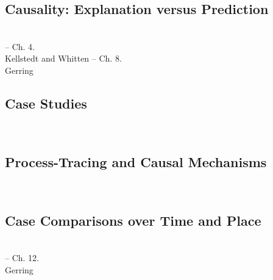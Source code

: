 \documentclass[12pt,a4paper]{article}
\newcommand{\lecture}[3][\DefaultOpt]{%
  \def\DefaultOpt{#2}%
  \clearpage\subsection[#1]{#2}\emph{#3}\vspace{.25em}\\
}
\newcommand{\reading}[2][]{\noindent -- {#1}\bibentry{#2}.\vspace{.25em}\\}
\newcommand{\textbook}[2][]{\noindent -- {#1}#2.\vspace{.25em}\\}
\begin{document}
\lecture{Causality: Explanation versus Prediction}{}
\textbook{Ch. 4}{Kellstedt and Whitten}
\textbook{Ch. 8}{Gerring}


\lecture{Case Studies}{}

\lecture{Process-Tracing and Causal Mechanisms}{}

\lecture{Case Comparisons over Time and Place}{}
\textbook{Ch. 12}{Gerring}
\end{document}
